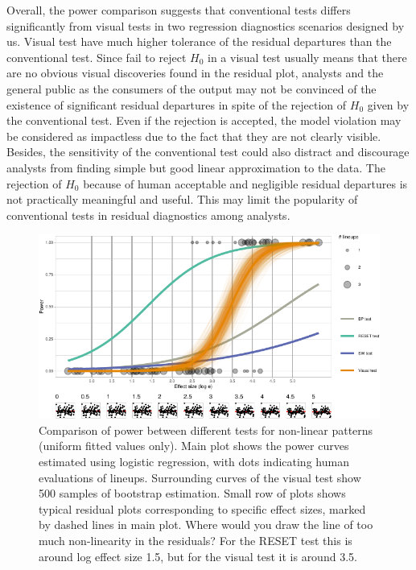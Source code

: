 \documentclass[]{interact}
\theoremstyle{plain}%
\theoremstyle{definition}
\theoremstyle{remark}
\begin{document}
Overall, the power comparison suggests that conventional tests differs
significantly from visual tests in two regression diagnostics scenarios
designed by us. Visual test have much higher tolerance of the residual
departures than the conventional test. Since fail to reject \(H_0\) in a
visual test usually means that there are no obvious visual discoveries
found in the residual plot, analysts and the general public as the
consumers of the output may not be convinced of the existence of
significant residual departures in spite of the rejection of \(H_0\)
given by the conventional test. Even if the rejection is accepted, the
model violation may be considered as impactless due to the fact that
they are not clearly visible. Besides, the sensitivity of the
conventional test could also distract and discourage analysts from
finding simple but good linear approximation to the data. The rejection
of \(H_0\) because of human acceptable and negligible residual
departures is not practically meaningful and useful. This may limit the
popularity of conventional tests in residual diagnostics among analysts.

\begin{figure}

{\centering \includegraphics[width=1\linewidth]{paper_comparison_files/figure-latex/polypower-1} 

}

\caption{Comparison of power between different tests for non-linear patterns (uniform fitted values only). Main plot shows the power curves estimated using logistic regression, with dots indicating human evaluations of lineups. Surrounding curves of the visual test show 500 samples of bootstrap estimation.  Small row of plots shows typical residual plots corresponding to specific effect sizes, marked by dashed lines in main plot. Where would you draw the line of too much non-linearity in the residuals? For the RESET test this is around log effect size 1.5, but for the visual test it is around 3.5.}\label{fig:polypower}
\end{figure}
\end{document}
